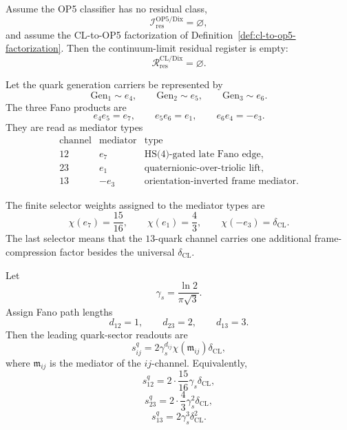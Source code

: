 \begin{lemma}
\label{lem:cl-residual-inheritance-op5}
Assume the OP5 classifier has no residual class,
\[
  \mathcal I_{\mathrm{res}}^{\mathrm{OP5/Dix}}=\varnothing,
\]
and assume the CL-to-OP5 factorization of
Definition~\ref{def:cl-to-op5-factorization}.  Then the continuum-limit
residual register is empty:
\[
  \mathcal R_{\mathrm{res}}^{\mathrm{CL/Dix}}=\varnothing.
\]
\end{lemma}

\begin{definition}
\label{def:fano-dixon-mediator-table}
Let the quark generation carriers be represented by
\[
  \mathrm{Gen}_1\sim e_4,
  \qquad
  \mathrm{Gen}_2\sim e_5,
  \qquad
  \mathrm{Gen}_3\sim e_6.
\]
The three Fano products are
\[
  e_4e_5=e_7,\qquad
  e_5e_6=e_1,\qquad
  e_6e_4=-e_3.
\]
They are read as mediator types
\[
\begin{array}{c|c|c}
\text{channel} & \text{mediator} & \text{type}\\
\hline
12 & e_7 & \text{HS(4)-gated late Fano edge},\\
23 & e_1 & \text{quaternionic-over-triolic lift},\\
13 & -e_3 & \text{orientation-inverted frame mediator}.
\end{array}
\]
\end{definition}

\begin{definition}
\label{def:fano-dixon-selectors}
The finite selector weights assigned to the mediator types are
\[
  \chi(e_7)=\frac{15}{16},
  \qquad
  \chi(e_1)=\frac43,
  \qquad
  \chi(-e_3)=\delta_{\mathrm{CL}}.
\]
The last selector means that the \(13\)-quark channel carries one
additional frame-compression factor besides the universal
\(\delta_{\mathrm{CL}}\).
\end{definition}

\begin{lemma}
\label{lem:quark-selector-normal-form}
Let
\[
  \gamma_s=\frac{\ln2}{\pi\sqrt3}.
\]
Assign Fano path lengths
\[
  d_{12}=1,\qquad d_{23}=2,\qquad d_{13}=3.
\]
Then the leading quark-sector readouts are
\[
  s_{ij}^{q}
  =
  2\gamma_s^{d_{ij}}
  \chi(\mathfrak m_{ij})
  \delta_{\mathrm{CL}},
\]
where \(\mathfrak m_{ij}\) is the mediator of the \(ij\)-channel.
Equivalently,
\[
  s_{12}^{q}
  =
  2\cdot\frac{15}{16}\gamma_s\delta_{\mathrm{CL}},
\]
\[
  s_{23}^{q}
  =
  2\cdot\frac43\gamma_s^2\delta_{\mathrm{CL}},
\]
\[
  s_{13}^{q}
  =
  2\gamma_s^3\delta_{\mathrm{CL}}^2.
\]
\end{lemma}

